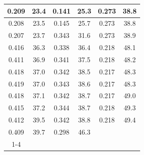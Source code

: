\begin{table}[]
\begin{tabular}{|cccccc}
\multicolumn{1}{|c|}{0.209}   & \multicolumn{1}{c|}{23.4}     & \multicolumn{1}{c|}{0.141}     & \multicolumn{1}{c|}{25.3}     & \multicolumn{1}{c|}{0.273}     & \multicolumn{1}{c|}{38.8}     \\ \hline
\multicolumn{1}{|c|}{0.208}   & \multicolumn{1}{c|}{23.5}     & \multicolumn{1}{c|}{0.145}     & \multicolumn{1}{c|}{25.7}     & \multicolumn{1}{c|}{0.273}     & \multicolumn{1}{c|}{38.8}     \\ \hline
\multicolumn{1}{|c|}{0.207}   & \multicolumn{1}{c|}{23.7}     & \multicolumn{1}{c|}{0.343}     & \multicolumn{1}{c|}{31.6}     & \multicolumn{1}{c|}{0.273}     & \multicolumn{1}{c|}{38.9}     \\ \hline
\multicolumn{1}{|c|}{0.416}   & \multicolumn{1}{c|}{36.3}     & \multicolumn{1}{c|}{0.338}     & \multicolumn{1}{c|}{36.4}     & \multicolumn{1}{c|}{0.218}     & \multicolumn{1}{c|}{48.1}     \\ \hline
\multicolumn{1}{|c|}{0.411}   & \multicolumn{1}{c|}{36.9}     & \multicolumn{1}{c|}{0.341}     & \multicolumn{1}{c|}{37.5}     & \multicolumn{1}{c|}{0.218}     & \multicolumn{1}{c|}{48.2}     \\ \hline
\multicolumn{1}{|c|}{0.418}   & \multicolumn{1}{c|}{37.0}     & \multicolumn{1}{c|}{0.342}     & \multicolumn{1}{c|}{38.5}     & \multicolumn{1}{c|}{0.217}     & \multicolumn{1}{c|}{48.3}     \\ \hline
\multicolumn{1}{|c|}{0.419}   & \multicolumn{1}{c|}{37.0}     & \multicolumn{1}{c|}{0.343}     & \multicolumn{1}{c|}{38.6}     & \multicolumn{1}{c|}{0.217}     & \multicolumn{1}{c|}{48.3}     \\ \hline
\multicolumn{1}{|c|}{0.418}   & \multicolumn{1}{c|}{37.1}     & \multicolumn{1}{c|}{0.342}     & \multicolumn{1}{c|}{38.7}     & \multicolumn{1}{c|}{0.217}     & \multicolumn{1}{c|}{49.0}     \\ \hline
\multicolumn{1}{|c|}{0.415}   & \multicolumn{1}{c|}{37.2}     & \multicolumn{1}{c|}{0.344}     & \multicolumn{1}{c|}{38.7}     & \multicolumn{1}{c|}{0.218}     & \multicolumn{1}{c|}{49.3}     \\ \hline
\multicolumn{1}{|c|}{0.412}   & \multicolumn{1}{c|}{39.5}     & \multicolumn{1}{c|}{0.342}     & \multicolumn{1}{c|}{38.8}     & \multicolumn{1}{c|}{0.218}     & \multicolumn{1}{c|}{49.4}     \\ \hline
\multicolumn{1}{|c|}{0.409}   & \multicolumn{1}{c|}{39.7}     & \multicolumn{1}{c|}{0.298}     & \multicolumn{1}{c|}{46.3}     &                                &                               \\ \cline{1-4}

\end{tabular}
\end{table}
